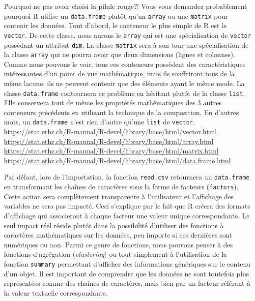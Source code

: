\begin{moreInfo}{Pourquoi ne pas avoir choisi la pilule rouge?!}
	Vous vous demandez probablement pourquoi R utilise un \texttt{data.frame} plutôt qu'un \texttt{array} ou une \texttt{matrix} pour contenir les données. Tout d'abord, le conteneur le plus simple de R est le \texttt{vector}. De cette classe, nous aurons le \texttt{array} qui est une spécialisation de \texttt{vector} possèdant un attribut \texttt{dim}. La classe \texttt{matrix} sera à son tour une spécialisation de la classe \texttt{array} qui ne pourra avoir que deux dimensions (lignes et colonnes). Comme nous pouvons le voir, tous ces conteneurs possèdent des caractéristiques intéressantes d'un point de vue mathématique, mais ils souffriront tous de la même lacune; ils ne peuvent contenir que des éléments ayant le même mode. La classe \texttt{data.frame} contournera ce problème en héritant plutôt de la classe \texttt{list}. Elle conservera tout de même les propriétés mathématiques des 3 autres conteneurs précédents en utilisant la technique de la composition. En d'autres mots, un \texttt{data.frame} n'est rien d'autre qu'une \texttt{list} de \texttt{vector}. \\
	\url{https://stat.ethz.ch/R-manual/R-devel/library/base/html/vector.html} \\
	\url{https://stat.ethz.ch/R-manual/R-devel/library/base/html/array.html} \\
	\url{https://stat.ethz.ch/R-manual/R-devel/library/base/html/matrix.html} \\
	\url{https://stat.ethz.ch/R-manual/R-devel/library/base/html/data.frame.html} 
\end{moreInfo}

Par défaut, lors de l'importation, la fonction \texttt{read.csv} retournera un \texttt{data.frame} en transformant les chaînes de caractères sous la forme de facteurs (\texttt{factors}). Cette action sera complètement transparente à l'utilisateur et l'affichage des variables ne sera pas impacté. Ceci s'explique par le fait que R créera des formats d'affichage qui associeront à chaque facteur une valeur unique correspondante. Le seul impact réel réside plutôt dans la possibilité d'utiliser des fonctions à caractères mathématiques sur les données, peu importe si ces dernières sont numériques ou non. Parmi ce genre de fonctions, nous pouvons penser à des fonctions d'agrégation (\emph{clustering}) ou tout simplement à l'utilisation de la fonction \texttt{summary} \cite{Rfunction:summary} permettant d'afficher des informations génériques sur le contenu d'un objet. Il est important de comprendre que les données ne sont toutefois plus représentées comme des chaînes de caractères, mais bien par un facteur référant à la valeur textuelle correspondante. \\

